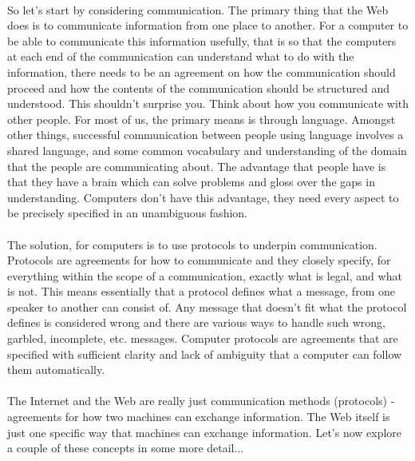 \paragraph{} So let's start by considering communication. The primary thing that the Web does is to communicate information from one place to another. For a computer to be able to communicate this information usefully, that is so that the computers at each end of the communication can understand what to do with the information, there needs to be an agreement on how the communication should proceed and how the  contents of the communication should be structured and understood. This shouldn't surprise you. Think about how you communicate with other people. For most of us, the primary means is through language. Amongst other things, successful communication between people using language involves a shared language, and some common vocabulary and understanding of the domain that the people are communicating about. The advantage that people have is that they have a brain which can solve problems and gloss over the gaps in understanding. Computers don't have this advantage, they need every aspect to be precisely specified in an unambiguous fashion.

\paragraph{} The solution, for computers is to use protocols to underpin communication. Protocols are agreements for how to communicate and they closely specify, for everything within the scope of a communication, exactly what is legal, and what is not. This means essentially that a protocol defines what a message, from one speaker to another can consist of. Any message that doesn't fit what the protocol defines is considered wrong and there are various ways to handle such wrong, garbled, incomplete, etc. messages. Computer protocols are agreements that are specified with sufficient clarity and lack of ambiguity that a computer can follow them automatically.

\paragraph{} The Internet and the Web are really just communication methods (protocols) - agreements for how two machines can exchange information. The Web itself is just one specific way that machines can exchange information. Let's now explore a couple of these concepts in some more detail...


